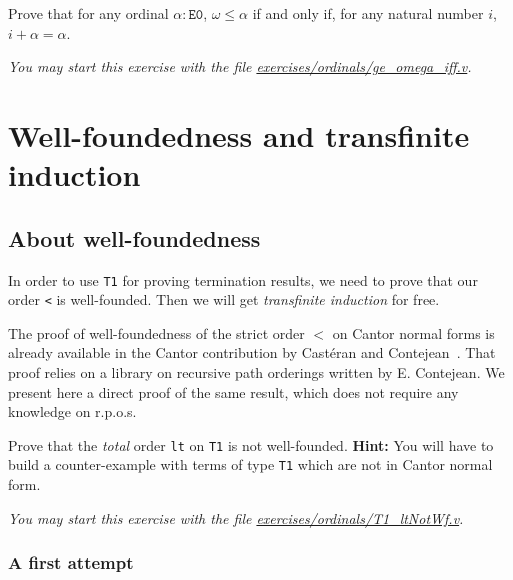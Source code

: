 \begin{exercise}
Prove that for any ordinal $\alpha:\texttt{E0}$, 
$\omega\leq \alpha$ if and only if, for any natural number $i$,
$i+\alpha=\alpha$.

\emph{You may start this exercise with the file
    \href{https://github.com/coq-community/hydra-battles/tree/master/exercises/ordinals/ge_omega_iff.v}{exercises/ordinals/ge\_omega\_iff.v}.}
\end{exercise}



\section{Well-foundedness and transfinite induction}


\subsection{About  well-foundedness}
\label{sec:orgheadline82}
   In order to use \texttt{T1} for proving termination results,
we need to prove that  our order \texttt{<} is well-founded. Then we will get \emph{transfinite induction} for free.


The proof of well-foundedness of the strict order $<$ on Cantor normal forms is already 
available in the Cantor contribution by Castéran and Contejean~\cite{CantorContrib}. That proof relies on a library on recursive path orderings written by
E. Contejean. We present here  a direct proof of the same result, which does not require any knowledge on r.p.o.s.


\begin{exercise}
Prove that the \emph{total} order \texttt{lt} on \texttt{T1} is not well-founded. 
\textbf{Hint:}  You will have to build a counter-example with terms of type \texttt{T1}
which are not in Cantor normal form.

\emph{You may start this exercise with the file
    \href{https://github.com/coq-community/hydra-battles/tree/master/exercises/ordinals/T1_ltNotWf.v}{exercises/ordinals/T1\_ltNotWf.v}.}
\end{exercise}

\subsubsection{A first attempt}
\label{sec:orgheadline77}

